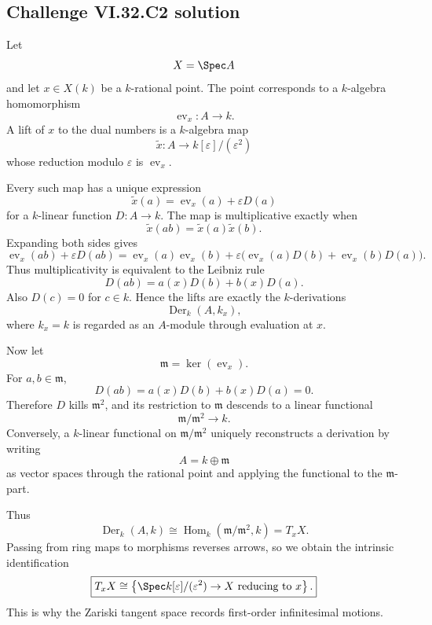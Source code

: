 \subsection*{Challenge VI.32.C2 solution}
\begin{solution}
Let
\[
X=\Spec A
\]
and let \(x\in X(k)\) be a \(k\)-rational point.  The point corresponds to a \(k\)-algebra homomorphism
\[
\operatorname{ev}_x:A\to k.
\]
A lift of \(x\) to the dual numbers is a \(k\)-algebra map
\[
\widetilde x:A\to k[\varepsilon]/(\varepsilon^2)
\]
whose reduction modulo \(\varepsilon\) is \(\operatorname{ev}_x\).

Every such map has a unique expression
\[
\widetilde x(a)
=
\operatorname{ev}_x(a)+\varepsilon D(a)
\]
for a \(k\)-linear function \(D:A\to k\).  The map is multiplicative exactly when
\[
\widetilde x(ab)=\widetilde x(a)\widetilde x(b).
\]
Expanding both sides gives
\[
\operatorname{ev}_x(ab)+\varepsilon D(ab)
=
\operatorname{ev}_x(a)\operatorname{ev}_x(b)
+
\varepsilon\bigl(
\operatorname{ev}_x(a)D(b)+\operatorname{ev}_x(b)D(a)
\bigr).
\]
Thus multiplicativity is equivalent to the Leibniz rule
\[
\boxed{
D(ab)
=
a(x)D(b)+b(x)D(a).
}
\]
Also \(D(c)=0\) for \(c\in k\).  Hence the lifts are exactly the \(k\)-derivations
\[
\operatorname{Der}_k(A,k_x),
\]
where \(k_x=k\) is regarded as an \(A\)-module through evaluation at \(x\).

Now let
\[
\mathfrak m=\ker(\operatorname{ev}_x).
\]
For \(a,b\in\mathfrak m\),
\[
D(ab)=a(x)D(b)+b(x)D(a)=0.
\]
Therefore \(D\) kills \(\mathfrak m^2\), and its restriction to \(\mathfrak m\) descends to a linear functional
\[
\mathfrak m/\mathfrak m^2\to k.
\]
Conversely, a \(k\)-linear functional on \(\mathfrak m/\mathfrak m^2\) uniquely reconstructs a derivation by writing
\[
A=k\oplus\mathfrak m
\]
as vector spaces through the rational point and applying the functional to the \(\mathfrak m\)-part.

Thus
\[
\operatorname{Der}_k(A,k)
\cong
\operatorname{Hom}_k(\mathfrak m/\mathfrak m^2,k)
=
T_xX.
\]
Passing from ring maps to morphisms reverses arrows, so we obtain the intrinsic identification
\[
\boxed{
T_xX
\cong
\left\{
\Spec k[\varepsilon]/(\varepsilon^2)\to X
\text{ reducing to }x
\right\}.
}
\]
This is why the Zariski tangent space records first-order infinitesimal motions.
\end{solution}

